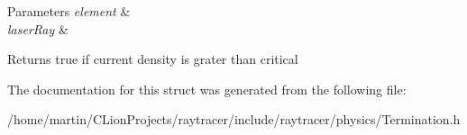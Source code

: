 \begin{DoxyParams}{Parameters}
{\em element} & \\
\hline
{\em laser\+Ray} & \\
\hline
\end{DoxyParams}
\begin{DoxyReturn}{Returns}
true if current density is grater than critical 
\end{DoxyReturn}


The documentation for this struct was generated from the following file\+:\begin{DoxyCompactItemize}
\item 
/home/martin/\+C\+Lion\+Projects/raytracer/include/raytracer/physics/Termination.\+h\end{DoxyCompactItemize}
